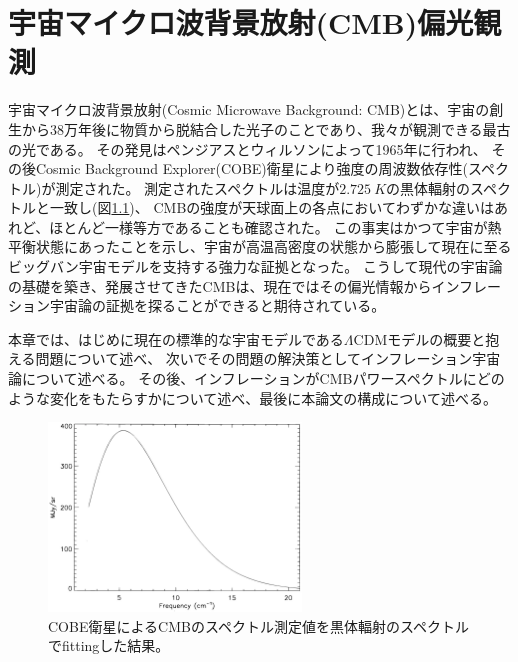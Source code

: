 \documentclass[../../main.tex]{subfiles}
\begin{document}
\chapter{宇宙マイクロ波背景放射(CMB)偏光観測}
宇宙マイクロ波背景放射(Cosmic Microwave Background: CMB)とは、宇宙の創生から38万年後に物質から脱結合した光子のことであり、我々が観測できる最古の光である。
その発見はペンジアスとウィルソンによって1965年に行われ\cite{1965ApJ...142..419P}、
その後Cosmic Background Explorer(COBE)衛星により強度の周波数依存性(スペクトル)が測定された\cite{1996ApJ...473..576F}。
測定されたスペクトルは温度が$\SI{2.725}{K}$の黒体輻射のスペクトルと一致し(図\ref{fig:cobe})、
CMBの強度が天球面上の各点においてわずかな違いはあれど、ほとんど一様等方であることも確認された。
この事実はかつて宇宙が熱平衡状態にあったことを示し、宇宙が高温高密度の状態から膨張して現在に至るビッグバン宇宙モデルを支持する強力な証拠となった。
こうして現代の宇宙論の基礎を築き、発展させてきたCMBは、現在ではその偏光情報からインフレーション宇宙論の証拠を探ることができると期待されている。

本章では、はじめに現在の標準的な宇宙モデルである$\Lambda\mathrm{CDM}$モデルの概要と抱える問題について述べ、
次いでその問題の解決策としてインフレーション宇宙論について述べる。
その後、インフレーションがCMBパワースペクトルにどのような変化をもたらすかについて述べ、最後に本論文の構成について述べる。

\begin{figure}[H]
    \centering
    \includegraphics[width=0.6\textwidth]{intro/cobe.pdf}
    \caption{COBE衛星によるCMBのスペクトル測定値を黒体輻射のスペクトルでfittingした結果。}
    \label{fig:cobe}
\end{figure}
\end{document}
